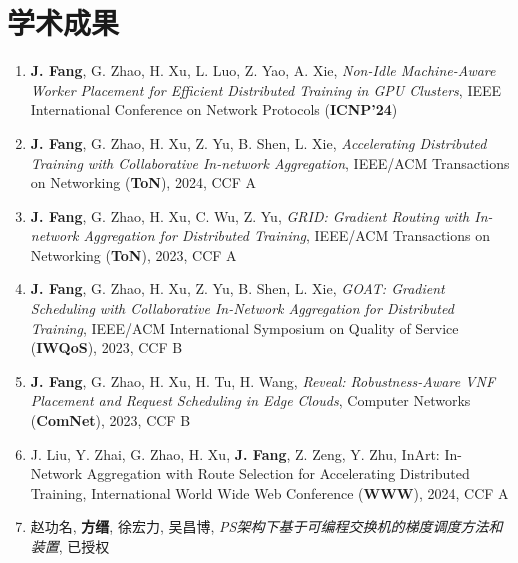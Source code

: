 \documentclass{resume}
\begin{document}

\section{学术成果}

\begin{enumerate}[parsep=0.5ex]
  \item \textbf{J. Fang}, G. Zhao, H. Xu, L. Luo, Z. Yao, A. Xie, \textit{Non-Idle Machine-Aware Worker Placement for Efficient Distributed Training in GPU Clusters}, IEEE International Conference on Network Protocols (\textbf{ICNP'24})
  \item \textbf{J. Fang}, G. Zhao, H. Xu, Z. Yu, B. Shen, L. Xie, \textit{Accelerating Distributed Training with Collaborative In-network Aggregation}, IEEE/ACM Transactions on Networking (\textbf{ToN}), 2024, CCF A
  \item \textbf{J. Fang}, G. Zhao, H. Xu, C. Wu, Z. Yu, \textit{GRID: Gradient Routing with In-network Aggregation for Distributed Training}, IEEE/ACM Transactions on Networking (\textbf{ToN}), 2023, CCF A
  \item \textbf{J. Fang}, G. Zhao, H. Xu, Z. Yu, B. Shen, L. Xie, \textit{GOAT: Gradient Scheduling with Collaborative In-Network Aggregation for Distributed Training}, IEEE/ACM International Symposium on Quality of Service (\textbf{IWQoS}), 2023, CCF B
  \item \textbf{J. Fang}, G. Zhao, H. Xu, H. Tu, H. Wang, \textit{Reveal: Robustness-Aware VNF Placement and Request Scheduling in Edge Clouds}, Computer Networks (\textbf{ComNet}), 2023, CCF B
  \item J. Liu, Y. Zhai, G. Zhao, H. Xu, \textbf{J. Fang}, Z. Zeng, Y. Zhu, InArt: In-Network Aggregation with Route Selection for Accelerating Distributed Training, International World Wide Web Conference (\textbf{WWW}), 2024, CCF A
  \item 赵功名, \textbf{方缙}, 徐宏力, 吴昌博, \textit{PS架构下基于可编程交换机的梯度调度方法和装置}, 已授权
\end{enumerate}
\end{document}
